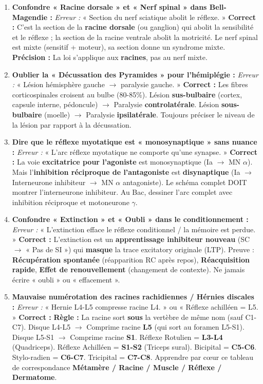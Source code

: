 \documentclass[11pt]{article}
\begin{document}
\begin{attention}
\begin{enumerate}
    \item \textbf{Confondre « Racine dorsale » et « Nerf spinal » dans Bell-Magendie :} \textit{Erreur :} « Section du nerf sciatique abolit le réflexe. » \textbf{Correct :} C'est la section de la \textbf{racine dorsale} (ou ganglion) qui abolit la sensibilité et le réflexe ; la section de la racine ventrale abolit la motricité. Le nerf spinal est mixte (sensitif + moteur), sa section donne un syndrome mixte. \textbf{Précision :} La loi s'applique aux \textbf{racines}, pas au nerf mixte.
    \item \textbf{Oublier la « Décussation des Pyramides » pour l'hémiplégie :} \textit{Erreur :} « Lésion hémisphère gauche $\rightarrow$ paralysie gauche. » \textbf{Correct :} Les fibres corticospinales croisent au bulbe (80-85\%). Lésion \textbf{sus-bulbaire} (cortex, capsule interne, pédoncule) $\rightarrow$ Paralysie \textbf{controlatérale}. Lésion \textbf{sous-bulbaire} (moelle) $\rightarrow$ Paralysie \textbf{ipsilatérale}. Toujours préciser le niveau de la lésion par rapport à la décussation.
    \item \textbf{Dire que le réflexe myotatique est « monosynaptique » sans nuance :} \textit{Erreur :} « L'arc réflexe myotatique ne comporte qu'une synapse. » \textbf{Correct :} La voie \textbf{excitatrice pour l'agoniste} est monosynaptique (Ia $\rightarrow$ MN $\alpha$). Mais l'\textbf{inhibition réciproque de l'antagoniste} est \textbf{disynaptique} (Ia $\rightarrow$ Interneurone inhibiteur $\rightarrow$ MN $\alpha$ antagoniste). Le schéma complet DOIT montrer l'interneurone inhibiteur. Au Bac, dessiner l'arc complet avec inhibition réciproque et motoneurone $\gamma$.
    \item \textbf{Confondre « Extinction » et « Oubli » dans le conditionnement :} \textit{Erreur :} « L'extinction efface le réflexe conditionnel / la mémoire est perdue. » \textbf{Correct :} L'extinction est un \textbf{apprentissage inhibiteur nouveau} (SC $\rightarrow$ « Pas de SI ») qui \textbf{masque} la trace excitatory originale (LTP). Preuve : \textbf{Récupération spontanée} (réapparition RC après repos), \textbf{Réacquisition rapide}, \textbf{Effet de renouvellement} (changement de contexte). Ne jamais écrire « oubli » ou « effacement ».
    \item \textbf{Mauvaise numérotation des racines rachidiennes / Hérnies discales :} \textit{Erreur :} « Hernie L4-L5 compresse racine L4. » ou « Réflexe achilléen = L5. » \textbf{Correct :} \textbf{Règle :} La racine sort \textbf{sous} la vertèbre de même nom (sauf C1-C7). Disque L4-L5 $\rightarrow$ Comprime racine \textbf{L5} (qui sort au foramen L5-S1). Disque L5-S1 $\rightarrow$ Comprime racine \textbf{S1}. Réflexe Rotulien = \textbf{L3-L4} (Quadriceps). Réflexe Achilléen = \textbf{S1-S2} (Triceps sural). Bicipital = \textbf{C5-C6}. Stylo-radien = \textbf{C6-C7}. Tricipital = \textbf{C7-C8}. Apprendre par cœur ce tableau de correspondance \textbf{Métamère / Racine / Muscle / Réflexe / Dermatome}.
\end{enumerate}
\end{attention}
\end{document}
